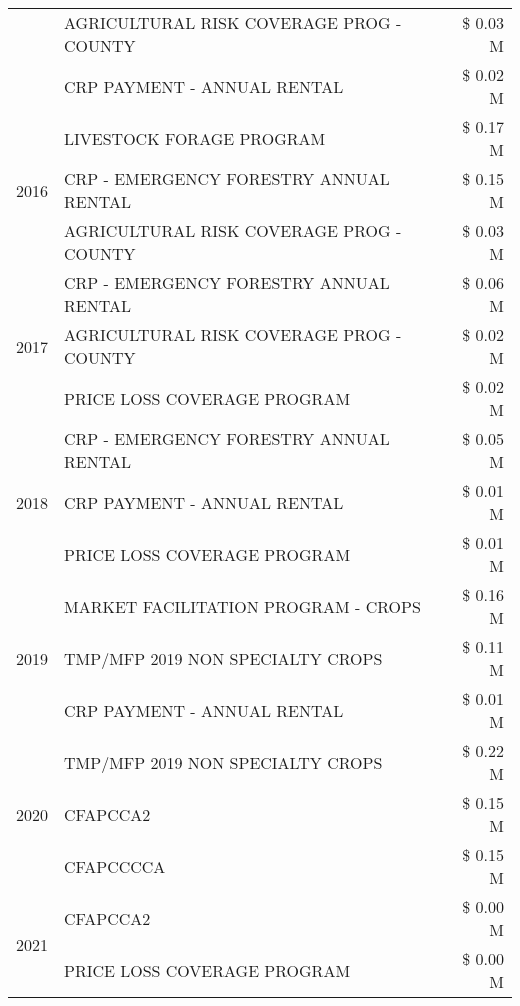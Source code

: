 \begin{tabular}{llr}
 & AGRICULTURAL RISK COVERAGE PROG - COUNTY & \$ 0.03 M \\
 & CRP PAYMENT - ANNUAL RENTAL & \$ 0.02 M \\
\cline{1-3}
\multirow[t]{3}{*}{2016} & LIVESTOCK FORAGE PROGRAM & \$ 0.17 M \\
 & CRP - EMERGENCY FORESTRY ANNUAL RENTAL & \$ 0.15 M \\
 & AGRICULTURAL RISK COVERAGE PROG - COUNTY & \$ 0.03 M \\
\cline{1-3}
\multirow[t]{3}{*}{2017} & CRP - EMERGENCY FORESTRY ANNUAL RENTAL & \$ 0.06 M \\
 & AGRICULTURAL RISK COVERAGE PROG - COUNTY & \$ 0.02 M \\
 & PRICE LOSS COVERAGE PROGRAM & \$ 0.02 M \\
\cline{1-3}
\multirow[t]{3}{*}{2018} & CRP - EMERGENCY FORESTRY ANNUAL RENTAL & \$ 0.05 M \\
 & CRP PAYMENT - ANNUAL RENTAL & \$ 0.01 M \\
 & PRICE LOSS COVERAGE PROGRAM & \$ 0.01 M \\
\cline{1-3}
\multirow[t]{3}{*}{2019} & MARKET FACILITATION PROGRAM - CROPS & \$ 0.16 M \\
 & TMP/MFP 2019 NON SPECIALTY CROPS & \$ 0.11 M \\
 & CRP PAYMENT - ANNUAL RENTAL & \$ 0.01 M \\
\cline{1-3}
\multirow[t]{3}{*}{2020} & TMP/MFP 2019 NON SPECIALTY CROPS & \$ 0.22 M \\
 & CFAPCCA2 & \$ 0.15 M \\
 & CFAPCCCCA & \$ 0.15 M \\
\cline{1-3}
\multirow[t]{2}{*}{2021} & CFAPCCA2 & \$ 0.00 M \\
 & PRICE LOSS COVERAGE PROGRAM & \$ 0.00 M \\
\cline{1-3}
\bottomrule
\end{tabular}

